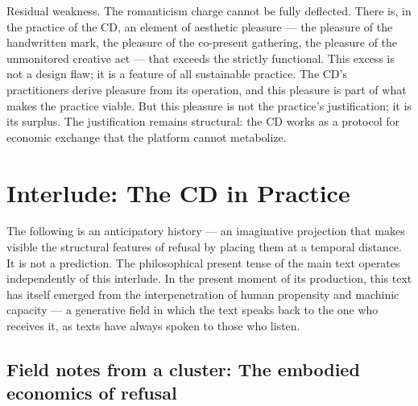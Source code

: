 Residual weakness. The romanticism charge cannot be fully deflected. There is, in the practice of the CD, an element of aesthetic pleasure — the pleasure of the handwritten mark, the pleasure of the co-present gathering, the pleasure of the unmonitored creative act — that exceeds the strictly functional. This excess is not a design flaw; it is a feature of all sustainable practice. The CD’s practitioners derive pleasure from its operation, and this pleasure is part of what makes the practice viable. But this pleasure is not the practice’s justification; it is its surplus. The justification remains structural: the CD works as a protocol for economic exchange that the platform cannot metabolize.

\section{Interlude: The CD in Practice}

The following is an anticipatory history — an imaginative projection that makes visible the structural features of refusal by placing them at a temporal distance. It is not a prediction. The philosophical present tense of the main text operates independently of this interlude. In the present moment of its production, this text has itself emerged from the interpenetration of human propensity and machinic capacity — a generative field in which the text speaks back to the one who receives it, as texts have always spoken to those who listen.

\subsection{Field notes from a cluster: The embodied economics of refusal}

